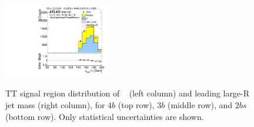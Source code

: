 \begin{figure}[htb!]
\begin{center}
\includegraphics[width=0.41\textwidth,angle=-90]{figures/boosted/TT/Moriond_TT_TwoTag_split_Signal_leadHCand_Mass_s.pdf}\\
\end{center}
\caption{TT signal region distribution of \mtwoJ~ (left column) and leading large-R jet mass (right column), for $4b$ (top row), $3b$ (middle row), and $2bs$ (bottom row). Only statistical uncertainties are shown.}
\label{fig:TTSR_Distribution}
\end{figure}
